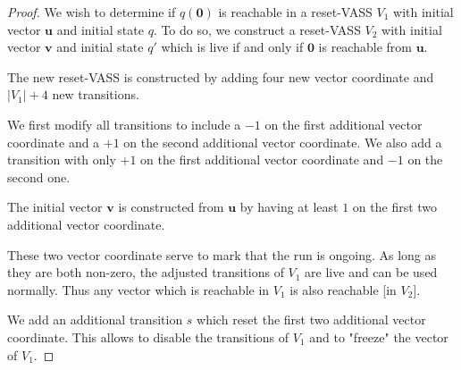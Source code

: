 \begin{proof}


We wish to determine if $q(\textbf{0})$ is reachable in a reset-VASS $V_1$
with
initial vector $\textbf{u}$ and initial state $q$.
To do so, we construct a reset-VASS $V_2$
with initial vector $\textbf{v}$ and initial state $q'$
which is live if and only if 
$\textbf{0}$
is reachable from $\textbf{u}$.

The new reset-VASS is constructed by adding four new vector coordinate
and
$|V_1|+4$ new transitions.

We first modify all transitions to include a $-1$ on the first additional vector coordinate and a $+1$ on the second additional vector coordinate. We also add a transition with only $+1$ on the first additional vector coordinate and $-1$ on the second one.



The initial vector $\textbf{v}$ is constructed from $\textbf{u}$ by having at least $1$ on the first two additional vector coordinate.



These two vector coordinate serve to mark that the run is ongoing. As long as they are both non-zero, the adjusted transitions of $V_1$ are live and can be used normally. Thus any vector which is reachable in $V_1$ is also reachable [in $V_2$].



We add an additional transition $s$ which reset the first two additional vector coordinate.
This allows to disable the transitions of $V_1$ and to "freeze" the vector of $V_1$.



\end{proof}

